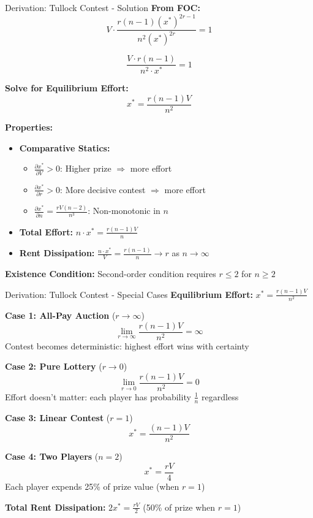 \documentclass[xcolor={x11names}]{beamer}
\begin{document}
\begin{frame}{Derivation: Tullock Contest - Solution}
\textbf{From FOC:}
$$V \cdot \frac{r(n-1)(x^*)^{2r-1}}{n^2 (x^*)^{2r}} = 1$$

$$\frac{V \cdot r(n-1)}{n^2 \cdot x^*} = 1$$

\textbf{Solve for Equilibrium Effort:}
$$\boxed{x^* = \frac{r(n-1)V}{n^2}}$$

\textbf{Properties:}
\begin{itemize}
  \item \textbf{Comparative Statics:}
  \begin{itemize}
    \item $\frac{\partial x^*}{\partial V} > 0$: Higher prize $\Rightarrow$ more effort
    \item $\frac{\partial x^*}{\partial r} > 0$: More decisive contest $\Rightarrow$ more effort
    \item $\frac{\partial x^*}{\partial n} = \frac{rV(n-2)}{n^3}$: Non-monotonic in $n$
  \end{itemize}
  \item \textbf{Total Effort:} $n \cdot x^* = \frac{r(n-1)V}{n}$
  \item \textbf{Rent Dissipation:} $\frac{n \cdot x^*}{V} = \frac{r(n-1)}{n} \to r$ as $n \to \infty$
\end{itemize}

\textbf{Existence Condition:}
Second-order condition requires $r \leq 2$ for $n \geq 2$
\end{frame}

\begin{frame}{Derivation: Tullock Contest - Special Cases}
\textbf{Equilibrium Effort:} $x^* = \frac{r(n-1)V}{n^2}$


\textbf{Case 1: All-Pay Auction} ($r \to \infty$)
$$\lim_{r \to \infty} \frac{r(n-1)V}{n^2} = \infty$$
Contest becomes deterministic: highest effort wins with certainty


\textbf{Case 2: Pure Lottery} ($r \to 0$)
$$\lim_{r \to 0} \frac{r(n-1)V}{n^2} = 0$$
Effort doesn't matter: each player has probability $\frac{1}{n}$ regardless


\textbf{Case 3: Linear Contest} ($r = 1$)
$$x^* = \frac{(n-1)V}{n^2}$$

\textbf{Case 4: Two Players} ($n = 2$)
$$x^* = \frac{rV}{4}$$
Each player expends 25\% of prize value (when $r=1$)

\textbf{Total Rent Dissipation:} $2x^* = \frac{rV}{2}$ (50\% of prize when $r=1$)
\end{frame}
\end{document}
